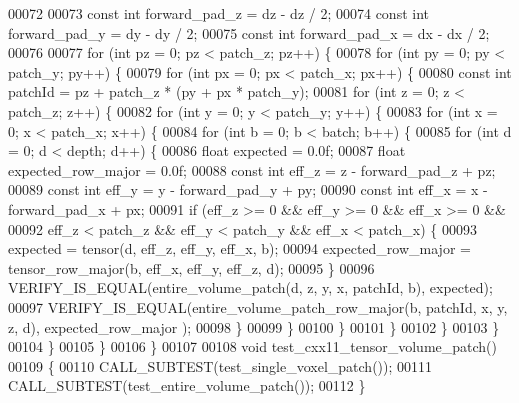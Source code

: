 \begin{DoxyCode}
00072 
00073   \textcolor{keyword}{const} \textcolor{keywordtype}{int} forward\_pad\_z = dz - dz / 2;
00074   \textcolor{keyword}{const} \textcolor{keywordtype}{int} forward\_pad\_y = dy - dy / 2;
00075   \textcolor{keyword}{const} \textcolor{keywordtype}{int} forward\_pad\_x = dx - dx / 2;
00076 
00077   \textcolor{keywordflow}{for} (\textcolor{keywordtype}{int} pz = 0; pz < patch\_z; pz++) \{
00078     \textcolor{keywordflow}{for} (\textcolor{keywordtype}{int} py = 0; py < patch\_y; py++) \{
00079       \textcolor{keywordflow}{for} (\textcolor{keywordtype}{int} px = 0; px < patch\_x; px++) \{
00080         \textcolor{keyword}{const} \textcolor{keywordtype}{int} patchId = pz + patch\_z * (py + px * patch\_y);
00081         \textcolor{keywordflow}{for} (\textcolor{keywordtype}{int} z = 0; z < patch\_z; z++) \{
00082           \textcolor{keywordflow}{for} (\textcolor{keywordtype}{int} y = 0; y < patch\_y; y++) \{
00083             \textcolor{keywordflow}{for} (\textcolor{keywordtype}{int} x = 0; x < patch\_x; x++) \{
00084               \textcolor{keywordflow}{for} (\textcolor{keywordtype}{int} b = 0; b < batch; b++) \{
00085                 \textcolor{keywordflow}{for} (\textcolor{keywordtype}{int} d = 0; d < depth; d++) \{
00086                   \textcolor{keywordtype}{float} expected = 0.0f;
00087                   \textcolor{keywordtype}{float} expected\_row\_major = 0.0f;
00088                   \textcolor{keyword}{const} \textcolor{keywordtype}{int} eff\_z = z - forward\_pad\_z + pz;
00089                   \textcolor{keyword}{const} \textcolor{keywordtype}{int} eff\_y = y - forward\_pad\_y + py;
00090                   \textcolor{keyword}{const} \textcolor{keywordtype}{int} eff\_x = x - forward\_pad\_x + px;
00091                   \textcolor{keywordflow}{if} (eff\_z >= 0 && eff\_y >= 0 && eff\_x >= 0 &&
00092                       eff\_z < patch\_z && eff\_y < patch\_y && eff\_x < patch\_x) \{
00093                     expected = tensor(d, eff\_z, eff\_y, eff\_x, b);
00094                     expected\_row\_major = tensor\_row\_major(b, eff\_x, eff\_y, eff\_z, d);
00095                   \}
00096                   VERIFY\_IS\_EQUAL(entire\_volume\_patch(d, z, y, x, patchId, b), expected);
00097                   VERIFY\_IS\_EQUAL(entire\_volume\_patch\_row\_major(b, patchId, x, y, z, d), expected\_row\_major
      );
00098                 \}
00099               \}
00100             \}
00101           \}
00102         \}
00103       \}
00104     \}
00105   \}
00106 \}
00107 
00108 \textcolor{keywordtype}{void} test\_cxx11\_tensor\_volume\_patch()
00109 \{
00110   CALL\_SUBTEST(test\_single\_voxel\_patch());
00111   CALL\_SUBTEST(test\_entire\_volume\_patch());
00112 \}
\end{DoxyCode}
